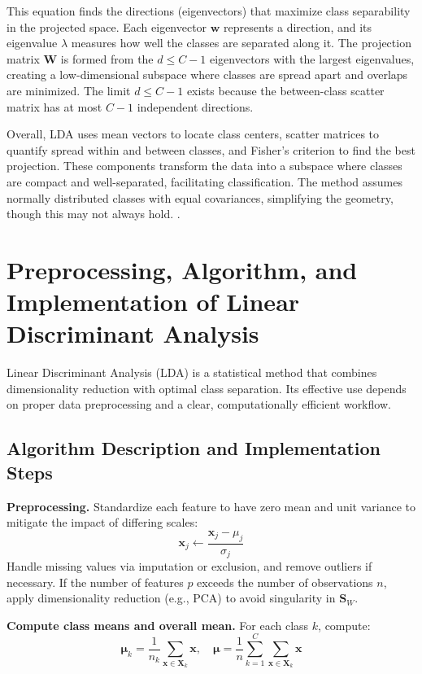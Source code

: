 \documentclass[12pt,a4paper]{article}
\begin{document}
This equation finds the directions (eigenvectors) that maximize class separability in the projected space. Each eigenvector $\mathbf{w}$ represents a direction, and its eigenvalue $\lambda$ measures how well the classes are separated along it. The projection matrix $\mathbf{W}$ is formed from the $d \le C-1$ eigenvectors with the largest eigenvalues, creating a low-dimensional subspace where classes are spread apart and overlaps are minimized. The limit $d \le C-1$ exists because the between-class scatter matrix has at most $C-1$ independent directions.

Overall, LDA uses mean vectors to locate class centers, scatter matrices to quantify spread within and between classes, and Fisher’s criterion to find the best projection. These components transform the data into a subspace where classes are compact and well-separated, facilitating classification. The method assumes normally distributed classes with equal covariances, simplifying the geometry, though this may not always hold. \cite{bishop2006pattern}.



\section{Preprocessing, Algorithm, and Implementation of Linear Discriminant Analysis}

Linear Discriminant Analysis (LDA) is a statistical method that combines dimensionality reduction with optimal class separation. Its effective use depends on proper data preprocessing and a clear, computationally efficient workflow.

\subsection{Algorithm Description and Implementation Steps}

\textbf{Preprocessing.} Standardize each feature to have zero mean and unit variance to mitigate the impact of differing scales:
\[
\mathbf{x}_j \leftarrow \frac{\mathbf{x}_j - \mu_j}{\sigma_j}
\]
Handle missing values via imputation or exclusion, and remove outliers if necessary. If the number of features $p$ exceeds the number of observations $n$, apply dimensionality reduction (e.g., PCA) to avoid singularity in $\mathbf{S}_W$.

\textbf{Compute class means and overall mean.} For each class $k$, compute:
\[
\boldsymbol{\mu}_k = \frac{1}{n_k} \sum_{\mathbf{x} \in \mathbf{X}_k} \mathbf{x}, \quad
\boldsymbol{\mu} = \frac{1}{n} \sum_{k=1}^C \sum_{\mathbf{x} \in \mathbf{X}_k} \mathbf{x}
\]
\end{document}
